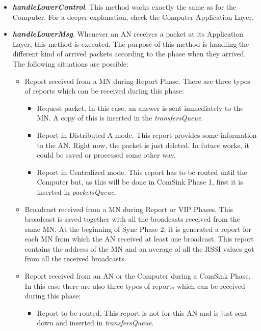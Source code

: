 \begin{itemize}
  \item \textbf{\textit{handleLowerControl}}. This method works exactly the same as for the Computer. For a deeper explanation, check the Computer 
  Application Layer.

  \item \textbf{\textit{handleLowerMsg}}. Whenever an \ac{AN} receives a packet at its Application Layer, this method is executed. The purpose
  of this method is handling the different kind of arrived packets according to the phase when they arrived. The following situations are possible:
  \begin{itemize}
    \item Report received from a \ac{MN} during Report Phase. There are three types of reports which can be received during this phase:
    \begin{itemize}
      \item Request packet. In this case, an answer is sent immediately to the \ac{MN}. A copy of this is inserted in the \textit{transfersQueue}.

      \item Report in Distributed-A mode. This report provides some information to the \ac{AN}. Right now, the packet is just deleted. In future
      works, it could be saved or processed some other way.

      \item Report in Centralized mode. This report has to be routed until the Computer but, as this will be done in ComSink Phase 1, first it is
      inserted in \textit{packetsQueue}.
    \end{itemize}

    \item Broadcast received from a \ac{MN} during Report or \ac{VIP} Phases. This broadcast is saved together with all the broadcasts received
    from the same \ac{MN}. At the beginning of Sync Phase 2, it is generated a report for each \ac{MN} from which the \ac{AN} received at least one 
    broadcast. This report contains the address of the \ac{MN} and an average of all the \ac{RSSI} values got from all the received broadcasts.

    \item Report received from an \ac{AN} or the Computer during a ComSink Phase. In this case there are also three types of reports which can be 
    received during this phase:
    \begin{itemize}
      \item Report to be routed. This report is not for this \ac{AN} and is just sent down and inserted in \textit{transfersQueue}.
      

\end{itemize}
\end{itemize}
\end{itemize}
